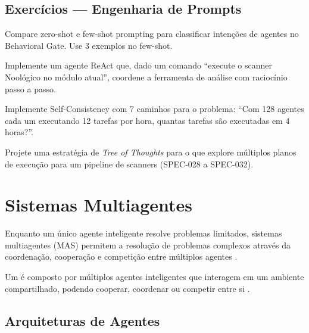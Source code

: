 \subsection{Exercícios — Engenharia de Prompts}
\begin{exercicio}
Compare zero-shot e few-shot prompting para classificar intenções de
agentes no Behavioral Gate. Use 3 exemplos no few-shot.
\end{exercicio}
\begin{exercicio}
Implemente um agente ReAct que, dado um comando ``execute o scanner
Noológico no módulo atual'', coordene a ferramenta de análise com
raciocínio passo a passo.
\end{exercicio}
\begin{exercicio}
Implemente Self-Consistency com 7 caminhos para o problema: ``Com 128
agentes cada um executando 12 tarefas por hora, quantas tarefas são
executadas em 4 horas?''.
\end{exercicio}
\begin{exercicio}
Projete uma estratégia de \textit{Tree of Thoughts} para o \opencodeeco{}
que explore múltiplos planos de execução para um pipeline de scanners
(SPEC-028 a SPEC-032).
\end{exercicio}
\section{Sistemas Multiagentes}
\label{sec:sistemas-multiagentes}
\nivelavancado
Enquanto um único agente inteligente resolve problemas limitados, sistemas
multiagentes (MAS) permitem a resolução de problemas complexos através da
coordenação, cooperação e competição entre múltiplos agentes
\cite{wooldridge2009multiagent, weiss2013multiagent}.
\begin{definicao}
Um  é composto por múltiplos agentes
inteligentes que interagem em um ambiente compartilhado, podendo cooperar,
coordenar ou competir entre si \cite{wooldridge2009multiagent}.
\end{definicao}
\subsection{Arquiteturas de Agentes}
